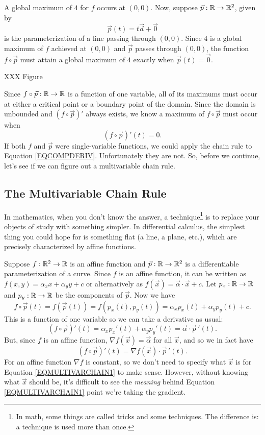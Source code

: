 A global maximum of $4$ for $f$ occurs at $(0,0)$.  Now, suppose $\vec p:\mathbb{R}\to\mathbb{R}^2$, given
by
\[
	\vec p(t) = t\vec d+\vec 0
\]
is the parameterization of a line passing through $(0,0)$.  Since $4$ is a global
maximum of $f$ achieved at $(0,0)$ and $\vec p$ passes through $(0,0)$, the function
$f\circ \vec p$ must attain a global maximum of $4$ exactly when $\vec p(t)=\vec 0$.

XXX Figure

Since $f\circ \vec p:\mathbb{R}\to\mathbb{R}$ is a function of one variable, all of its maximums
must occur at either a critical point or a boundary point of the domain.  Since
the domain is unbounded and $(f\circ \vec p)'$ always exists, we know a maximum
of $f\circ \vec p$ must occur when
\begin{equation}
	\label{EQCOMPDERIV}
	(f\circ\vec p)'(t)=0.
\end{equation}
If both $f$ and $\vec p$ were single-variable functions, we could
apply the chain rule to Equation \eqref{EQCOMPDERIV}.  Unfortunately they
are not.  So, before we continue, let's see if we can figure out a multivariable
chain rule.

\subsection{The Multivariable Chain Rule}

In mathematics, when you don't know the answer, a technique\footnote{
In math, some things are called tricks and some techniques.  The difference is:
a technique is used more than once.} is to
replace your objects of study with something simpler.  In differential calculus,
the simplest thing you could hope for is something flat (a line, a plane, etc.), which
are precisely characterized by affine functions.

Suppose $f:\mathbb{R}^2\to\mathbb{R}$ is an affine function and $\vec p:\mathbb{R}\to\mathbb{R}^2$ is a differentiable
parameterization of a curve.  Since $f$ is an affine function, it can be written
as $f(x,y)=\alpha_x x+\alpha_y y+c$ or alternatively as
$f(\vec x) = \vec \alpha\cdot \vec x+c$.  Let $p_x:\mathbb{R}\to\mathbb{R}$ and $p_y:\mathbb{R}\to\mathbb{R}$ be the components
of $\vec p$.  Now we have
\[
	f\circ \vec p(t) = f(\vec p(t)) = f(p_x(t),p_y(t))=\alpha_xp_x(t)+\alpha_yp_y(t)+c.
\]
This is a function of one variable so we can take a derivative as usual:
\[
	(f\circ\vec p)'(t) = \alpha_xp_x'(t)+\alpha_yp_y'(t) = \vec \alpha\cdot \vec p\,'(t).
\]
But, since $f$ is an affine function, $\nabla f(\vec x)=\vec \alpha$ for
all $\vec x$, and so we in fact have
\begin{equation}
	\label{EQMULTIVARCHAIN1}
	(f\circ\vec p)'(t) = \nabla f(\vec x)\cdot \vec p\,'(t).
\end{equation}
For an affine function $\nabla f$ is constant, so we don't need to specify what
$\vec x$ is for Equation \eqref{EQMULTIVARCHAIN1} to make sense.  However, without
knowing what $\vec x$ should be, it's difficult to see the \emph{meaning} behind
Equation \eqref{EQMULTIVARCHAIN1}
point we're taking the gradient.


